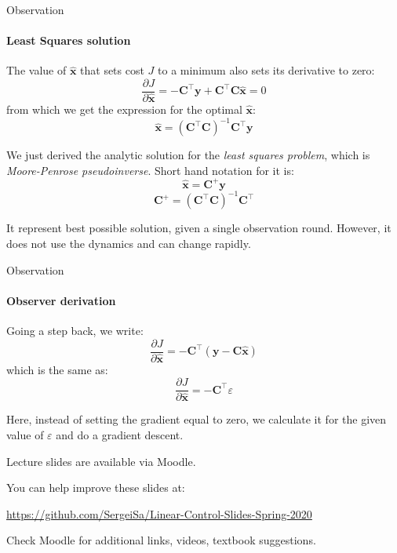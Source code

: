 \documentclass{beamer}
\begin{document}
\begin{frame}{Observation}
\framesubtitle{Least Squares solution}
\begin{flushleft}

The value of $\hat{\mathbf x}$ that sets cost $J$ to a minimum also sets its derivative to zero:
%
\[
\frac{\partial J}{\partial \hat{\mathbf x}} = 
-\mathbf C^\top \mathbf y + 
\mathbf C^\top \mathbf C \hat{\mathbf x} = 0
\]
%
from which we get the expression for the optimal $\hat{\mathbf x}$:
%
\[
 \hat{\mathbf x} = (\mathbf C^\top \mathbf C)^{-1} \mathbf C^\top \mathbf y
\]

We just derived the analytic solution for the \emph{least squares problem}, which is \emph{Moore-Penrose pseudoinverse}. Short hand notation for it is:
%
\[
 \hat{\mathbf x} = \mathbf C^+ \mathbf y
\]
\[
\mathbf C^+ =  (\mathbf C^\top \mathbf C)^{-1} \mathbf C^\top
\]

It represent best possible solution, given a single observation round. However, it does not use the dynamics and can change rapidly.


\end{flushleft}
\end{frame}

\begin{frame}{Observation}
\framesubtitle{Observer derivation}
\begin{flushleft}

Going a step back, we write:
%
\[
\frac{\partial J}{\partial \hat{\mathbf x}} = 
-\mathbf C^\top (\mathbf y - 
\mathbf C \hat{\mathbf x})
\]
%
which is the same as:
%
\[
\frac{\partial J}{\partial \hat{\mathbf x}} = -\mathbf C^\top \varepsilon
\]

Here, instead of setting the gradient equal to zero, we calculate it for the given value of $\varepsilon$ and do a gradient descent.

\end{flushleft}
\end{frame}


\begin{frame}
\centerline{Lecture slides are available via Moodle.}
\bigskip
\centerline{You can help improve these slides at:}
\centerline{\url{https://github.com/SergeiSa/Linear-Control-Slides-Spring-2020}}
\bigskip
\centerline{Check Moodle for additional links, videos, textbook suggestions.}
\end{frame}
\end{document}
